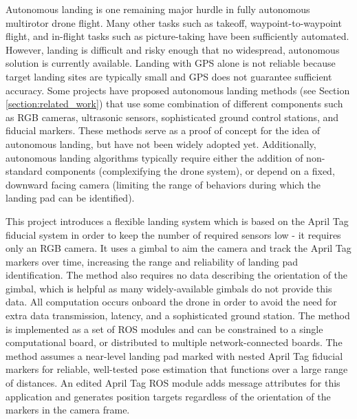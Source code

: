 Autonomous landing is one remaining major hurdle in fully autonomous multirotor drone flight.
Many other tasks such as takeoff, waypoint-to-waypoint flight, and in-flight tasks such as picture-taking have been
sufficiently automated.
However, landing is difficult and risky enough that no widespread, autonomous solution is currently available.
Landing with GPS alone is not reliable because target landing sites are typically small and GPS does not guarantee sufficient accuracy.
Some projects have proposed autonomous landing methods (see Section \ref{section:related_work})
that use some combination of different components such as RGB cameras, ultrasonic sensors,
sophisticated ground control stations, and fiducial markers.
These methods serve as a proof of concept for the idea of autonomous landing, but have not been widely adopted yet.
{\color{red}Additionally, autonomous landing algorithms typically require either the addition of non-standard components (complexifying the drone system),
or depend on a fixed, downward facing camera (limiting the range of behaviors during which the landing pad can be identified).}


{\color{red}This project introduces a flexible landing system which is based on the April Tag\cite{apriltag3_paper} fiducial system
in order to keep the number of required sensors low - it requires only an RGB camera.
It uses a gimbal to aim the camera and track the April Tag markers over time, increasing the range and reliability of landing pad identification.
The method also requires no data describing the orientation of the gimbal, which is helpful as many widely-available
gimbals do not provide this data.
All computation occurs onboard the drone in order to avoid the need for extra data transmission, latency, and a
sophisticated ground station.
}
The method is implemented as a set of ROS modules and can be constrained to a single computational board,
or distributed to multiple network-connected boards.
The method assumes a near-level landing pad marked with nested April Tag fiducial markers for reliable, well-tested
pose estimation that functions over a large range of distances.
An edited April Tag ROS module adds message attributes for this application and generates position targets
regardless of the orientation of the markers in the camera frame.

